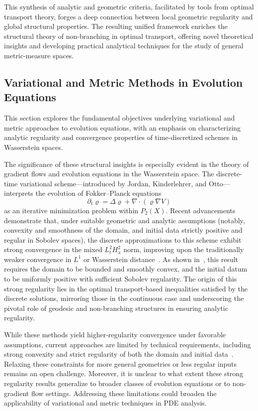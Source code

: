 \documentclass[sigconf]{acmart}
\begin{document}
This synthesis of analytic and geometric criteria, facilitated by tools from optimal transport theory, forges a deep connection between local geometric regularity and global structural properties. The resulting unified framework enriches the structural theory of non-branching in optimal transport, offering novel theoretical insights and developing practical analytical techniques for the study of general metric-measure spaces.

\subsection{Variational and Metric Methods in Evolution Equations}

This section explores the fundamental objectives underlying variational and metric approaches to evolution equations, with an emphasis on characterizing analytic regularity and convergence properties of time-discretized schemes in Wasserstein spaces.

The significance of these structural insights is especially evident in the theory of gradient flows and evolution equations in the Wasserstein space. The discrete-time variational scheme—introduced by Jordan, Kinderlehrer, and Otto—interprets the evolution of Fokker--Planck equations
\[
\partial_t \varrho = \Delta \varrho + \nabla\cdot(\varrho \nabla V)
\]
as an iterative minimization problem within $P_2(X)$. Recent advancements demonstrate that, under suitable geometric and analytic assumptions (notably, convexity and smoothness of the domain, and initial data strictly positive and regular in Sobolev spaces), the discrete approximations to this scheme exhibit strong convergence in the mixed $L^2_t H^2_x$ norm, improving upon the traditionally weaker convergence in $L^1$ or Wasserstein distance~\cite{ref96}. As shown in~\cite{ref96}, this result requires the domain to be bounded and smoothly convex, and the initial datum to be uniformly positive with sufficient Sobolev regularity. The origin of this strong regularity lies in the optimal transport-based inequalities satisfied by the discrete solutions, mirroring those in the continuous case and underscoring the pivotal role of geodesic and non-branching structures in ensuring analytic regularity.

While these methods yield higher-regularity convergence under favorable assumptions, current approaches are limited by technical requirements, including strong convexity and strict regularity of both the domain and initial data~\cite{ref96}. Relaxing these constraints for more general geometries or less regular inputs remains an open challenge. Moreover, it is unclear to what extent these strong regularity results generalize to broader classes of evolution equations or to non-gradient flow settings. Addressing these limitations could broaden the applicability of variational and metric techniques in PDE analysis.
\end{document}
